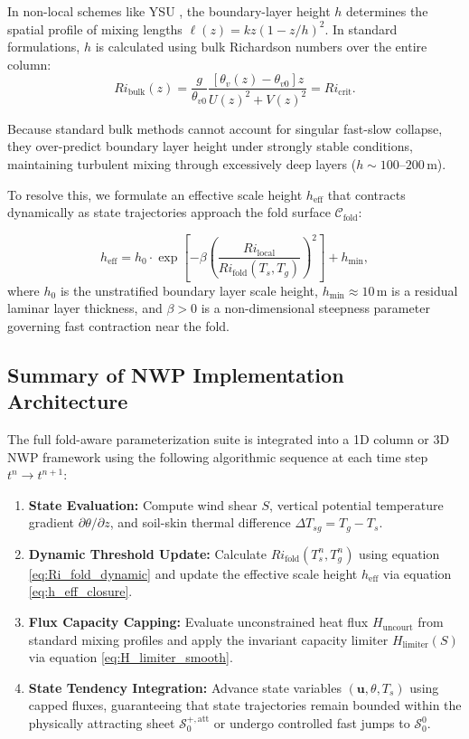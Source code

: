 In non-local schemes like YSU \citep{Hong2006}, the boundary-layer height $h$ determines the spatial profile of mixing lengths $\ell(z) = k z (1 - z/h)^2$. In standard formulations, $h$ is calculated using bulk Richardson numbers over the entire column:
\begin{equation}
Ri_{\mathrm{bulk}}(z) = \frac{g}{\theta_{v0}} \frac{[\theta_v(z) - \theta_{v0}] z}{U(z)^2 + V(z)^2} = Ri_{\mathrm{crit}}.
\end{equation}

Because standard bulk methods cannot account for singular fast-slow collapse, they over-predict boundary layer height under strongly stable conditions, maintaining turbulent mixing through excessively deep layers ($h \sim 100\text{--}200\,\mathrm{m}$).

To resolve this, we formulate an effective scale height $h_{\mathrm{eff}}$ that contracts dynamically as state trajectories approach the fold surface $\mathcal{C}_{\mathrm{fold}}$:

\begin{equation}
\boxed{
h_{\mathrm{eff}} = h_0 \cdot \exp\left[ -\beta \left( \frac{Ri_{\mathrm{local}}}{Ri_{\mathrm{fold}}(T_s, T_g)} \right)^2 \right] + h_{\mathrm{min}},
}
\label{eq:h_eff_closure}
\end{equation}
where $h_0$ is the unstratified boundary layer scale height, $h_{\mathrm{min}} \approx 10\,\mathrm{m}$ is a residual laminar layer thickness, and $\beta > 0$ is a non-dimensional steepness parameter governing fast contraction near the fold.

\subsection{Summary of NWP Implementation Architecture}

The full fold-aware parameterization suite is integrated into a 1D column or 3D NWP framework using the following algorithmic sequence at each time step $t^n \to t^{n+1}$:

\begin{enumerate}
    \item \textbf{State Evaluation:} Compute wind shear $S$, vertical potential temperature gradient $\partial \theta / \partial z$, and soil-skin thermal difference $\Delta T_{sg} = T_g - T_s$.
    \item \textbf{Dynamic Threshold Update:} Calculate $Ri_{\mathrm{fold}}(T_s^n, T_g^n)$ using equation \eqref{eq:Ri_fold_dynamic} and update the effective scale height $h_{\mathrm{eff}}$ via equation \eqref{eq:h_eff_closure}.
    \item \textbf{Flux Capacity Capping:} Evaluate unconstrained heat flux $H_{\mathrm{uncourt}}$ from standard mixing profiles and apply the invariant capacity limiter $H_{\mathrm{limiter}}(S)$ via equation \eqref{eq:H_limiter_smooth}.
    \item \textbf{State Tendency Integration:} Advance state variables $(\mathbf{u}, \theta, T_s)$ using capped fluxes, guaranteeing that state trajectories remain bounded within the physically attracting sheet $\mathcal{S}_0^{+,\mathrm{att}}$ or undergo controlled fast jumps to $\mathcal{S}_0^0$.
\end{enumerate}